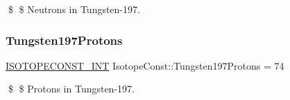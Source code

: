 \$ \$ Neutrons in Tungsten-\/197. \mbox{\label{group___isotope_const-_tungsten-_w197_gafc902ee4c1d02a7a08091a935b741156}} 
\subsubsection{\texorpdfstring{Tungsten197\+Protons}{Tungsten197Protons}}
{\footnotesize\ttfamily \mbox{\hyperlink{group___isotope_const-_macros_ga5f18360b3e99483a35c32d789e62621c}{I\+S\+O\+T\+O\+P\+E\+C\+O\+N\+S\+T\+\_\+\+I\+NT}} Isotope\+Const\+::\+Tungsten197\+Protons = 74}

\$ \$ Protons in Tungsten-\/197. 